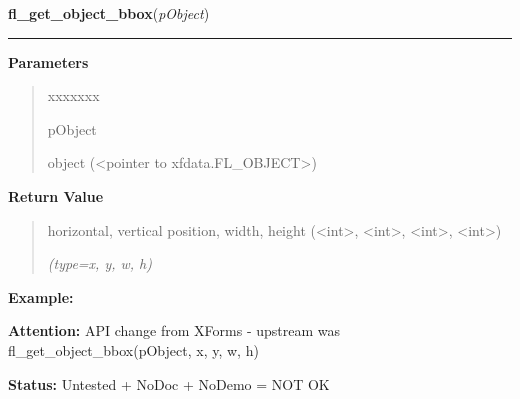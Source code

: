 \hspace{.8\funcindent}\begin{boxedminipage}{\funcwidth}

    \raggedright \textbf{fl\_get\_object\_bbox}(\textit{pObject})

    \vspace{-1.5ex}

    \rule{\textwidth}{0.5\fboxrule}
\setlength{\parskip}{2ex}
\setlength{\parskip}{1ex}
      \textbf{Parameters}
      \vspace{-1ex}

      \begin{quote}
        \begin{Ventry}{xxxxxxx}

          \item[pObject]

          object ({\textless}pointer to xfdata.FL\_OBJECT{\textgreater})

        \end{Ventry}

      \end{quote}

      \textbf{Return Value}
    \vspace{-1ex}

      \begin{quote}
      horizontal, vertical position, width, height 
      ({\textless}int{\textgreater}, {\textless}int{\textgreater}, 
      {\textless}int{\textgreater}, {\textless}int{\textgreater})

      {\it (type=x, y, w, h)}

      \end{quote}

\textbf{Example:} 

\textbf{Attention:} API change from XForms - upstream was fl\_get\_object\_bbox(pObject, x, y, 
w, h)



\textbf{Status:} Untested + NoDoc + NoDemo = NOT OK



    \end{boxedminipage}

    \label{xformslib:library:fl_get_object_bbox}

    \vspace{0.5ex}

